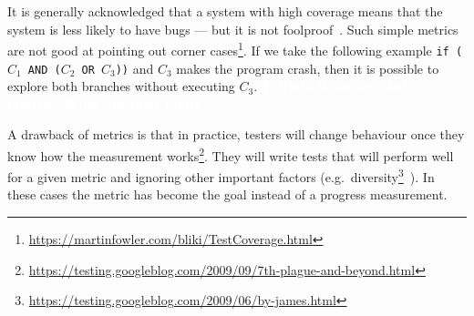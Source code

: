 \documentclass[a4paper,11pt]{sdm_internship}
\newcommand{\todo}[1]{\colorbox{Red!75}{\textcolor{white}{\textbf{TODO\ifx&#1&\else: #1\fi}}}}
\theoremstyle{definition}
\begin{document}
It is generally acknowledged that a system with high coverage means that the system is less likely to have bugs --- but it is not foolproof~\cite{hovemeyer2004finding,inozemtseva2014coverage}.
Such simple metrics are not good at pointing out corner cases\footnote{\url{https://martinfowler.com/bliki/TestCoverage.html}}.
If we take the following example \texttt{if ($C_1$ AND ($C_2$ OR $C_3$))} and $C_3$ makes the program crash, then it is possible to explore both branches without executing $C_3$.
\todo{What are their limits}

A drawback of metrics is that in practice, testers will change behaviour once they know how the measurement works\footnote{\url{https://testing.googleblog.com/2009/09/7th-plague-and-beyond.html}}.
They will write tests that will perform well for a given metric and ignoring other important factors (e.g.\ diversity\footnote{\url{https://testing.googleblog.com/2009/06/by-james.html}}~\cite{baudry2014diversify,baudry2015multiple}).
In these cases the metric has become the goal instead of a progress measurement.

\end{document}
